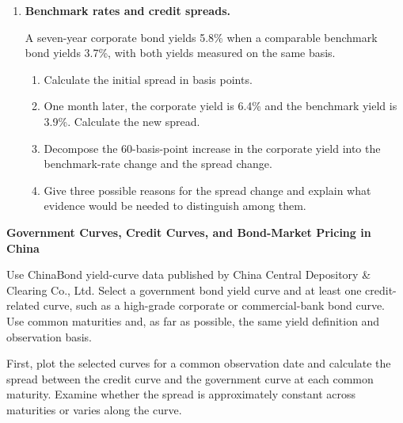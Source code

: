\begin{enumerate}
\begin{enumerate}
\item Explain why the convexity term has the same sign for equal increases and decreases in yield.

\end{enumerate}

\item \textbf{Benchmark rates and credit spreads.}

A seven-year corporate bond yields 5.8\% when a comparable benchmark bond yields 3.7\%, with both yields measured on the same basis.

\begin{enumerate}

\item Calculate the initial spread in basis points.

\item One month later, the corporate yield is 6.4\% and the benchmark yield is 3.9\%. Calculate the new spread.

\item Decompose the 60-basis-point increase in the corporate yield into the benchmark-rate change and the spread change.

\item Give three possible reasons for the spread change and explain what evidence would be needed to distinguish among them.

\end{enumerate}

\end{enumerate}



\textbf{Government Curves, Credit Curves, and Bond-Market Pricing in China}

Use ChinaBond yield-curve data published by China Central Depository \& Clearing Co., Ltd. Select a government bond yield curve and at least one credit-related curve, such as a high-grade corporate or commercial-bank bond curve. Use common maturities and, as far as possible, the same yield definition and observation basis.

First, plot the selected curves for a common observation date and calculate the spread between the credit curve and the government curve at each common maturity. Examine whether the spread is approximately constant across maturities or varies along the curve.


